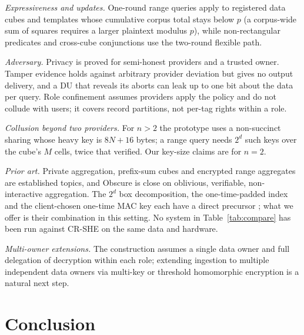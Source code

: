\documentclass[a4paper,fleqn]{cas-sc}
\begin{document}
\emph{Expressiveness and updates.} One-round range queries apply to registered
data cubes and templates whose cumulative corpus total stays below $p$ (a
corpus-wide sum of squares requires a larger plaintext modulus $p$), while
non-rectangular predicates and cross-cube conjunctions use the two-round
flexible path.

\emph{Adversary.} Privacy is proved for semi-honest providers and a trusted
owner. Tamper evidence holds against arbitrary provider deviation but gives no
output delivery, and a DU that reveals its aborts can leak up to one bit about
the data per query. Role confinement assumes providers apply the policy and do
not collude with users; it covers record partitions, not per-tag rights within
a role.

\emph{Collusion beyond two providers.} For $n>2$ the prototype uses a
non-succinct sharing whose heavy key is $8N+16$ bytes; a range query needs
$2^d$ such keys over the cube's $M$ cells, twice that verified. Our key-size
claims are for $n=2$.

\emph{Prior art.} Private aggregation, prefix-sum cubes and encrypted range
aggregates are established topics, and Obscure is close on oblivious,
verifiable, non-interactive aggregation. The $2^d$ box decomposition, the
one-time-padded index and the client-chosen one-time MAC key each have a
direct precursor \citep{boyle2016function,dory,li2026silent}; what we offer is
their combination in this setting. No system in Table~\ref{tab:compare} has
been run against CR-SHE on the same data and hardware.

\emph{Multi-owner extensions.} The construction assumes a single data owner
and full delegation of decryption within each role; extending ingestion to
multiple independent data owners via multi-key or threshold homomorphic
encryption is a natural next step.

\section{Conclusion}
\label{sec:conclusion}
\end{document}
